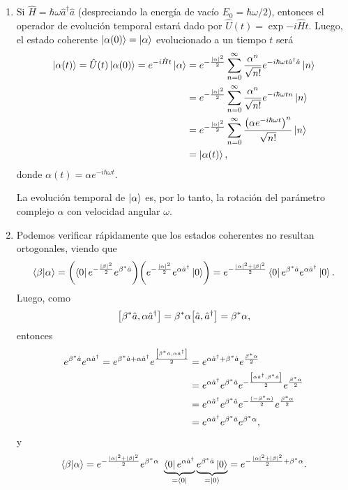 \documentclass{scrartcl}
\renewcommand{\a}{\hat{a}}
\DeclareRobustCommand{\[}{\begin{equation}}
\DeclareRobustCommand{\]}{\end{equation}}
\begin{document}
\begin{enumerate}
\begin{enumerate}
        
        \item Si $\hat H = \hbar \omega \a^\dagger \a$ (despreciando la energía de vacío $E_0 = \hbar \omega / 2$), entonces el operador de evolución temporal estará dado por $\hat U(t) = \exp{-i \hat H t}$. Luego, el estado coherente $\ket{\alpha(0)} = \ket{\alpha}$ evolucionado a un tiempo $t$ será
        \begin{align}
            \ket{\alpha(t)} = \hat U(t) \ket{\alpha(0)} = e^{-i \hat H t} \ket{\alpha} &= e^{-\frac{\abs{\alpha}^2}{2}} \sum_{n = 0}^\infty \frac{\alpha^n}{\sqrt{n!}} e^{-i\hbar \omega t \a^\dagger \a} \ket{n} \\
                &= e^{-\frac{\abs{\alpha}^2}{2}} \sum_{n = 0}^\infty \frac{\alpha^n}{\sqrt{n!}} e^{-i\hbar \omega t n} \ket{n} \\
                &= e^{-\frac{\abs{\alpha}^2}{2}} \sum_{n = 0}^\infty \frac{\qty(\alpha e^{-i\hbar \omega t})^n}{\sqrt{n!}} \ket{n} \\
                &= \ket{\alpha(t)},
        \end{align}
        donde $\displaystyle \alpha(t) = \alpha e^{-i\hbar \omega t}$.
        
        La evolución temporal de $\ket{\alpha}$ es, por lo tanto, la rotación del parámetro complejo $\alpha$ con velocidad angular $\omega$.
        
        
        \item Podemos verificar rápidamente que los estados coherentes no resultan ortogonales, viendo que
        \[ \ip{\beta}{\alpha} = \qty( \bra{0} e^{-\frac{\abs{\beta}^2}{2}} e^{\beta^* \a}) \qty(e^{-\frac{\abs{\alpha}^2}{2}} e^{\alpha \a^\dagger} \ket{0}) = e^{-\frac{\abs{\alpha}^2 + \abs{\beta}^2}{2}} \bra{0} e^{\beta^* \a} e^{\alpha \a^\dagger} \ket{0}. \]
        Luego, como
        \[ \comm{\beta^* \a}{\alpha \a^\dagger} = \beta^* \alpha \comm{\a}{\a^\dagger} = \beta^* \alpha, \]
        entonces
        \begin{align}
            e^{\beta^* \a} e^{\alpha \a^\dagger} = e^{\beta^* \a + \alpha \a^\dagger} e^{\frac{\comm{\beta^* \a}{\alpha \a^\dagger}}{2}} &= e^{\alpha \a^\dagger + \beta^* \a} e^{\frac{\beta^* \alpha}{2}} \\
                &= e^{\alpha \a^\dagger} e^{\beta^* \a} e^{-\frac{\comm{\alpha \a^\dagger}{\beta^* \a}}{2}} e^{\frac{\beta^* \alpha}{2}} \\
                &= e^{\alpha \a^\dagger} e^{\beta^* \a} e^{-\frac{(-\beta^* \alpha)}{2}} e^{\frac{\beta^* \alpha}{2}} \\
                &= e^{\alpha \a^\dagger} e^{\beta^* \a} e^{\beta^* \alpha},
        \end{align}
        y
        \begin{align}
            \ip{\beta}{\alpha} = e^{-\frac{\abs{\alpha}^2 + \abs{\beta}^2}{2}} e^{\beta^* \alpha} \ \underbrace{\bra{0} e^{\alpha \a^\dagger}}_{= \bra{0}} \underbrace{e^{\beta^* \a} \ket{0}}_{= \ket{0}} = e^{-\frac{\abs{\alpha}^2 + \abs{\beta}^2}{2} + \beta^* \alpha}.
        \end{align}
        

\end{enumerate}
\end{enumerate}
\end{document}

